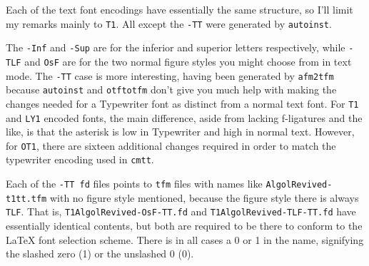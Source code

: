 \documentclass[11pt]{article}
\begin{document}
Each of the text font encodings have essentially the same structure, so I'll  limit my remarks mainly to {\tt T1}. All except the {\tt -TT} were generated by {\tt autoinst}.

The {\tt -Inf} and {\tt -Sup} are for the inferior and superior letters respectively, while {\tt -TLF} and {\tt OsF} are for the two normal figure styles you might choose from in text mode. The {\tt -TT} case is more interesting, having been generated by {\tt afm2tfm} because {\tt autoinst} and {\tt otftotfm} don't give you much help with making the changes needed for  a Typewriter font as distinct from a normal text font. For {\tt T1} and {\tt LY1} encoded fonts, the main difference, aside from lacking f-ligatures and the like, is that the asterisk is low in Typewriter and high in normal text. However, for {\tt OT1}, there are sixteen additional changes required in order to match the typewriter encoding used in {\tt cmtt}.

Each of the {\tt -TT fd} files points to {\tt tfm} files with names like
{\tt AlgolRevived-t1tt.tfm} with no figure style mentioned, because the figure style there is always {\tt TLF}. That is, {\tt T1AlgolRevived-OsF-TT.fd} and 
{\tt T1AlgolRevived-TLF-TT.fd} have essentially identical contents, but both are required to be there to conform to the LaTeX font selection scheme. There is in all cases a 0 or 1 in the name, signifying the slashed zero (1) or the unslashed 0 (0).
\end{document}
